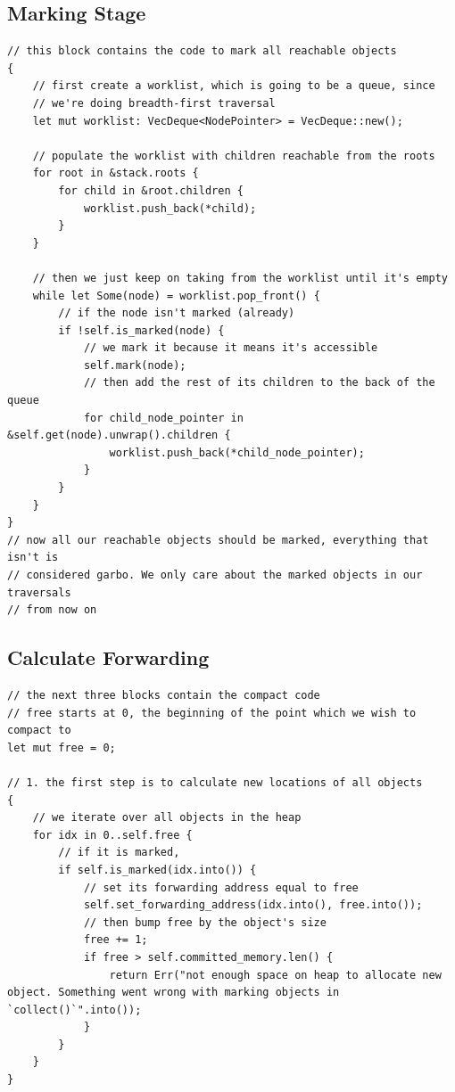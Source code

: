 \documentclass[index]{subfiles}
\begin{document}
\subsection{Marking Stage}
\begin{verbatim}
// this block contains the code to mark all reachable objects
{
    // first create a worklist, which is going to be a queue, since
    // we're doing breadth-first traversal
    let mut worklist: VecDeque<NodePointer> = VecDeque::new();

    // populate the worklist with children reachable from the roots
    for root in &stack.roots {
        for child in &root.children {
            worklist.push_back(*child);
        }
    }

    // then we just keep on taking from the worklist until it's empty
    while let Some(node) = worklist.pop_front() {
        // if the node isn't marked (already)
        if !self.is_marked(node) {
            // we mark it because it means it's accessible
            self.mark(node);
            // then add the rest of its children to the back of the queue
            for child_node_pointer in &self.get(node).unwrap().children {
                worklist.push_back(*child_node_pointer);
            }
        }
    }
}
// now all our reachable objects should be marked, everything that isn't is
// considered garbo. We only care about the marked objects in our traversals
// from now on
\end{verbatim}
\subsection{Calculate Forwarding}
\begin{verbatim}
// the next three blocks contain the compact code
// free starts at 0, the beginning of the point which we wish to compact to
let mut free = 0;

// 1. the first step is to calculate new locations of all objects
{
    // we iterate over all objects in the heap
    for idx in 0..self.free {
        // if it is marked,
        if self.is_marked(idx.into()) {
            // set its forwarding address equal to free
            self.set_forwarding_address(idx.into(), free.into());
            // then bump free by the object's size
            free += 1;
            if free > self.committed_memory.len() {
                return Err("not enough space on heap to allocate new object. Something went wrong with marking objects in `collect()`".into());
            }
        }
    }
}
\end{verbatim}
\end{document}
